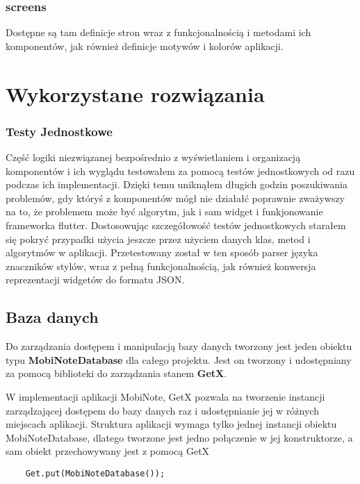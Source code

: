 \subsubsection{screens}

Dostępne są tam definicje stron wraz z funkcjonalnością i metodami ich komponentów, jak również definicje motywów i kolorów aplikacji.

\section{Wykorzystane rozwiązania}

\subsubsection{Testy Jednostkowe}

Część logiki niezwiązanej bezpośrednio z wyświetlaniem i organizacją komponentów i ich wyglądu testowałem za pomocą testów jednostkowych od razu podczas ich implementacji. Dzięki temu uniknąłem długich godzin poszukiwania problemów, gdy któryś z komponentów mógł nie działałć poprawnie zważywszy na to, że problemem może być algorytm, jak i sam widget i funkjonowanie frameworka flutter. Dostosowując szczegółowość testów jednostkowych starałem się pokryć przypadki użycia jeszcze przez użyciem danych klas, metod i algorytmów w aplikacji. Przetestowany został w ten sposób parser języka znaczników stylów, wraz z pełną funkcjonalnością, jak również konwersja reprezentacji widgetów do formatu JSON.

\subsection{Baza danych}

Do zarządzania dostępem i manipulacją bazy danych tworzony jest jeden obiektu typu \textbf{MobiNoteDatabase} dla całego projektu. Jest on tworzony i udostępniany za pomocą biblioteki do zarządzania stanem \textbf{GetX}. 

W implementacji aplikacji MobiNote, GetX pozwala na tworzenie instancji zarządzającej dostępem do bazy danych raz i udostępnianie jej w różnych miejscach aplikacji. Struktura aplikacji wymaga tylko jednej instancji obiektu MobiNoteDatabase, dlatego tworzone jest jedno połączenie w jej konstruktorze, a sam obiekt przechowywany jest z pomocą GetX

\begin{verbatim}
    Get.put(MobiNoteDatabase());
\end{verbatim}

